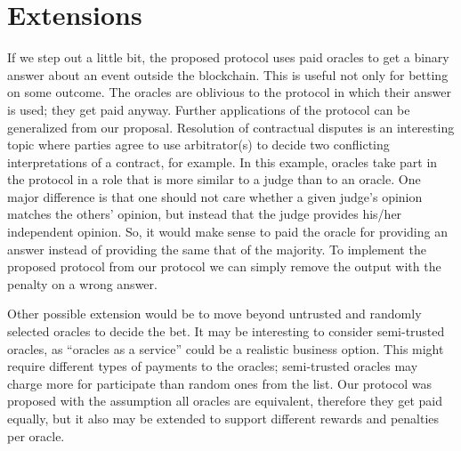 \section{Extensions}

If we step out a little bit, the proposed protocol uses paid oracles to get a
  binary answer about an event outside the blockchain.
This is useful not only for betting on some outcome.
The oracles are oblivious to the protocol in which their answer is used; they
  get paid anyway.
Further applications of the protocol can be generalized from our proposal.
Resolution of contractual disputes is an interesting topic where parties agree
  to use arbitrator(s) to decide two conflicting interpretations of a contract,
  for example.
In this example, oracles take part in the protocol in a role that is more
  similar to a judge than to an oracle.
One major difference is that one should not care whether a given judge's
  opinion matches the others' opinion, but instead that the judge provides
  his/her independent opinion.
So, it would make sense to paid the oracle for providing an answer instead of
  providing the same that of the majority.
To implement the proposed protocol from our protocol we can simply remove the
  output with the penalty on a wrong answer.

Other possible extension would be to move beyond untrusted and randomly
  selected oracles to decide the bet.
It may be interesting to consider semi-trusted oracles, as ``oracles as a
  service'' could be a realistic business option.
This might require different types of payments to the oracles; semi-trusted
  oracles may charge more for participate than random ones from the list.
Our protocol was proposed with the assumption all oracles are equivalent,
  therefore they get paid equally, but it also may be extended to support
  different rewards and penalties per oracle.
